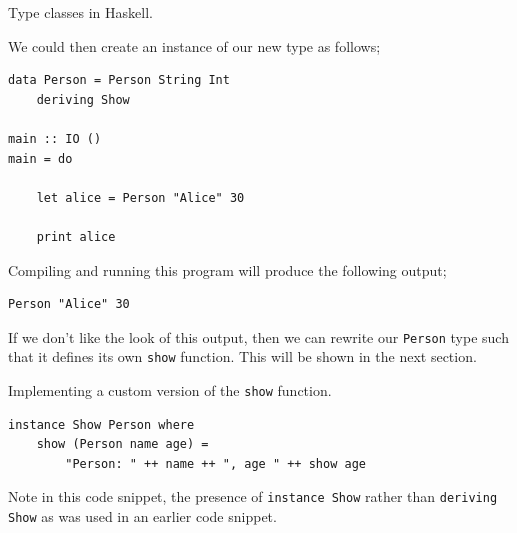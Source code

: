 \begin{frame}[t, fragile]{Type classes in Haskell.}

We could then create an instance of our new type as follows;

\begin{verbatim}
data Person = Person String Int
    deriving Show

main :: IO ()
main = do

    let alice = Person "Alice" 30

    print alice
\end{verbatim}

Compiling and running this program will produce the following output;

\begin{verbatim}
Person "Alice" 30
\end{verbatim}

If we don't like the look of this output, then we can rewrite our \texttt{Person}
type such that it defines its own \texttt{show} function. This will be shown in the
next section.

\end{frame}



\begin{frame}[t, fragile]{Implementing a custom version of the \texttt{show} function.}

\begin{verbatim}
instance Show Person where
    show (Person name age) =
        "Person: " ++ name ++ ", age " ++ show age
\end{verbatim}

Note in this code snippet, the presence of \texttt{instance Show} rather than
\texttt{deriving Show} as was used in an earlier code snippet.

\end{frame}


